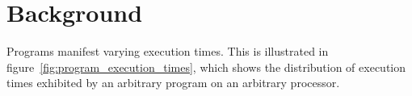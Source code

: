 % 

\section{Background}
\label{bookmark:timing_anomalies}

Programs manifest varying execution times.
This is illustrated in figure~\ref{fig:program_execution_times}, which shows the distribution of execution times exhibited by an arbitrary program on an arbitrary processor.

